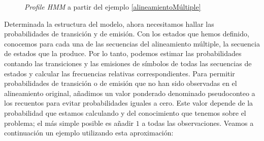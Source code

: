 \begin{figure}[H]
\caption{\textit{Profile HMM} a partir del ejemplo \ref{alineamientoMúltiple}}
\label{profileHMMFinal}
\end{figure}

Determinada la estructura del modelo, ahora necesitamos hallar las probabilidades de transición y de emisión. Con los estados que hemos definido, conocemos para cada una de las secuencias del alineamiento múltiple, la secuencia de estados que la produce. Por lo tanto, podemos estimar las probabilidades contando las transiciones y las emisiones de símbolos de todas las secuencias de estados y calcular las frecuencias relativas correspondientes. Para permitir probabilidades de transición o de emisión que no han sido observadas en el alineamiento original, añadimos un valor ponderado denominado pseudoconteo a los recuentos para evitar probabilidades iguales a cero. Este valor depende de la probabilidad que estamos calculando y del conocimiento que tenemos sobre el problema; el más simple posible es añadir $1$ a todas las observaciones. Veamos a continuación un ejemplo utilizando esta aproximación:

